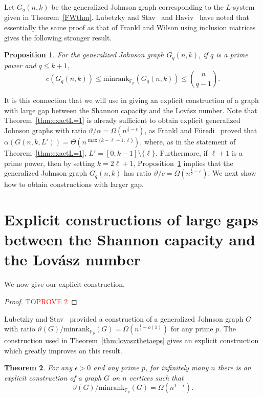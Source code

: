 \documentclass[11pt]{article}
\newtheorem{theorem}{Theorem}[section]
\newtheorem{proposition}[theorem]{Proposition}
\theoremstyle{definition}
\theoremstyle{remark}
\begin{document}
Let $G_q(n, k)$ be the generalized Johnson graph corresponding to the $L$-system given in Theorem~\ref{FWthm}. Lubetzky and Stav~\cite{LubStav} and Haviv~\cite[Proposition 4.5]{Haviv} have noted that essentially the same proof as that of Frankl and Wilson using inclusion matrices gives the following stronger result. 

\begin{proposition}\label{lshprop}
For the generalized Johnson graph $G_q(n, k)$, if $q$ is a prime power and $q\le k+1$, 
\[c(G_q(n, k)) \le \text{minrank}_{\mathbb{F}_p}(G_q(n, k)) \le \binom{n}{q-1}.\]
\end{proposition}

It is this connection that we will use in giving an explicit construction of a graph with large gap between the Shannon capacity and the Lov\'asz number. Note that Theorem~\ref{thm:exactL=1} is already sufficient to obtain explicit generalized Johnson graphs with ratio $\vartheta/\alpha = \Omega(n^{\frac12 - \epsilon})$, as Frankl and F\"{u}redi~\cite{FF} proved that $\alpha(G(n, k, L')) = \Theta(n^{\max\{k-\ell-1, \ell\}})$, where, as in the statement of Theorem~\ref{thm:exactL=1}, $L' = [0, k-1]\setminus\{\ell\}$.  Furthermore, if $\ell+1$ is a prime power, then by setting $k=2\ell+1$, Proposition~\ref{lshprop} implies that the generalized Johnson graph $G_{q}(n, k)$ has ratio $\vartheta/c = \Omega(n^{\frac12 - \epsilon})$. We next show how to obtain constructions with larger gap.

\section{Explicit constructions of large gaps between the Shannon capacity and the Lov\'asz number}

We now give our explicit construction. 





\begin{proof}\textcolor{red}{TOPROVE 2}\end{proof}

Lubetzky and Stav~\cite{LubStav} provided a construction of a generalized Johnson graph $G$ with ratio $\vartheta(G)/\text{minrank}_{\mathbb{F}_p}(G) = \Omega(n^{\frac12 - o(1)})$ for any prime $p$. 
The construction used in Theorem~\ref{thm:lovaszthetaeps} gives an explicit construction which greatly improves on this result.

\begin{theorem}\label{thm:fixpcons}
For any $\epsilon > 0$ and any prime $p$, for infinitely many $n$ there is an explicit construction of a graph $G$ on $n$ vertices such that \[\vartheta(G)/\text{minrank}_{\mathbb{F}_p}(G) = \Omega(n^{1-\epsilon}).\]
\end{theorem}
\end{document}
